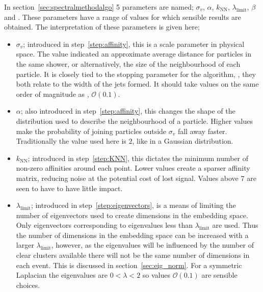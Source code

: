 In section~\ref{sec:spectralmethodalgo} 5 parameters are named;
\(\sigma_v\), \(\alpha\), \(k_\text{NN}\), \(\lambda_\text{limit}\), \(\beta\) and \stoppingdeltar{}.
These parameters have a range of values for which sensible results are obtained.
The interpretation of these parameters is given here;
\begin{itemize}
    \item \(\sigma_v\); introduced in step~\ref{step:affinity}, this is a scale parameter in physical space.
                      The value indicated an approximate average distance for particles in the same shower,
                      or alternatively, the size of the neighbourhood of each particle.
                      It is closely tied to the stopping parameter for the \genkt{} algorithm, \ktstoppingdeltar{},
                      they both relate to the width of the jets formed.
                      It should take values on the same order of magnitude as \ktstoppingdeltar{}, \(\mathcal{O} (0.1)\).
    \item  \(\alpha\); also introduced in step~\ref{step:affinity},
           this changes the shape of the distribution used to describe the neighbourhood of a particle.
           Higher values make the probability of joining particles outside \(\sigma_v\) fall away faster.
           Traditionally the value used here is \(2\), like in a Gaussian distribution.
       \item \(k_\text{NN}\); introduced in step~\ref{step:KNN}, this dictates the minimum number of non-zero affinities around each point.
           Lower values create a sparser affinity matrix, reducing noise at the potential cost of lost signal.
           Values above \(7\) are seen to have to have little impact.
       \item  \(\lambda_\text{limit}\); introduced in step~\ref{step:eigenvectors}, is a means of limiting the number of eigenvectors used
           to create dimensions in the embedding space.
           Only eigenvectors corresponding to eigenvalues less than \(\lambda_\text{limit}\) are used.
           Thus the number of dimensions in the embedding space can be increased with a larger \(\lambda_\text{limit}\),
           however, as the eigenvalues will be influenced by the number of clear clusters available 
           there will not be the same number of dimensions in each event.
           This is discussed in section~\ref{sec:eig_norm}.
           For a symmetric Laplacian the eigenvalues are \(0 < \lambda < 2\)
           so values \(\mathcal{O} (0.1)\) are sensible choices.

\end{itemize}
